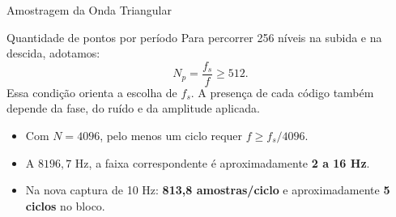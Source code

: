 \begin{frame}{Amostragem da Onda Triangular}
\begin{block}{Quantidade de pontos por período}
Para percorrer 256 níveis na subida e na descida, adotamos:
\[
N_p=\frac{f_s}{f}\geq512.
\]
Essa condição orienta a escolha de $f_s$. A presença de cada código também depende da fase, do ruído e da amplitude aplicada.
\end{block}
\begin{itemize}
\item Com $N=4096$, pelo menos um ciclo requer $f\geq f_s/4096$.
\item A $8196{,}7$ Hz, a faixa correspondente é aproximadamente \textbf{2 a 16 Hz}.
\item Na nova captura de 10 Hz: \textbf{813,8 amostras/ciclo} e aproximadamente \textbf{5 ciclos} no bloco.
\end{itemize}
\end{frame}

